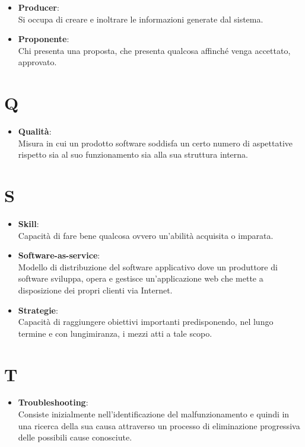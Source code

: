 \documentclass[a4paper, oneside, openany, dvipsnames, table]{article}
\begin{document}
\begin{itemize}
\item \textbf{Producer}:\\	Si occupa di creare e inoltrare le informazioni generate dal sistema.
\end{itemize}

\begin{itemize}
\item \textbf{Proponente}:\\	Chi presenta una proposta, che presenta qualcosa affinché venga accettato, approvato.
\end{itemize}

\newpage
\section{Q}
\begin{itemize}
\item \textbf{Qualità}:\\	Misura in cui un prodotto software soddisfa un certo numero di aspettative rispetto sia al suo funzionamento sia alla sua struttura interna.
\end{itemize}

\newpage
\section{S}
\begin{itemize}
\item \textbf{Skill}:\\	Capacità di fare bene qualcosa ovvero un'abilità acquisita o imparata.
\end{itemize}

\begin{itemize}
\item \textbf{Software-as-service}:\\	Modello di distribuzione del software applicativo dove un produttore di software sviluppa, opera e gestisce un'applicazione web che mette a disposizione dei propri clienti via Internet.
\end{itemize}

\begin{itemize}
\item \textbf{Strategie}:\\	Capacità di raggiungere obiettivi importanti predisponendo, nel lungo termine e con lungimiranza, i mezzi atti a tale scopo.
\end{itemize}


\newpage
\section{T}
\begin{itemize}
\item \textbf{Troubleshooting}:\\	Consiste inizialmente nell'identificazione del malfunzionamento e quindi in una ricerca della sua causa attraverso un processo di eliminazione progressiva delle possibili cause conosciute.
\end{itemize}
\end{document}

